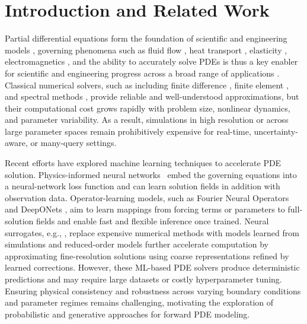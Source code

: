 \section{Introduction and Related Work}
Partial differential equations \citep[PDEs,][]{evans2022partial, strauss2007partial} form the foundation of scientific and engineering models \citep{ames2016nonlinear}, governing phenomena such as fluid flow \citep{naz2008comparison}, heat transport \citep{crank1947practical}, elasticity \citep{smith1990domain}, electromagnetics \citep{10.1098/rstl.1865.0008}, 
and the ability to accurately solve PDEs is thus a key enabler for scientific and engineering progress across a broad range of applications
\citep{zachmanoglou1986introduction}. Classical numerical solvers, such as including finite difference \citep{leveque2007finite}, finite element \citep{johnson2009numerical}, and spectral methods \citep{trefethen2000spectral}, provide reliable and well-understood approximations, but their computational cost grows rapidly with problem size, nonlinear dynamics, and parameter variability. As a result, simulations in high resolution or across large parameter spaces remain prohibitively expensive for real-time, uncertainty-aware, or many-query settings.

Recent efforts have explored machine learning techniques to accelerate PDE solution. Physics-informed neural networks~\citep[PINNs,][]{cai2021physics, cai2021physicsheat, raissi2019physics} embed the governing equations into a neural-network loss function and can learn solution fields in addition with observation data. Operator-learning models, such as Fourier Neural Operators \citep{li2020fourier, li2023fourier} and DeepONets \citep{lu2019deeponet, lu2021learning}, aim to learn mappings from forcing terms or parameters to full-solution fields and enable fast and flexible inference once trained. Neural surrogates, e.g., \citep{kochkov2021machine,sanchez-gonzalez20a-GNS}, replace expensive numerical methods with models learned from simulations 
and reduced-order models \citep{tripathy2018deep, white2019multiscale, eason2014adaptive} further accelerate computation by approximating fine-resolution solutions using coarse representations refined by learned corrections. However, these ML-based PDE solvers produce deterministic predictions \citep{huang2024diffusionpdegenerativepdesolvingpartial} and may require large datasets or costly hyperparameter tuning. Ensuring physical consistency and robustness across varying boundary conditions and parameter regimes remains challenging, motivating the exploration of probabilistic and generative approaches for forward PDE modeling.

